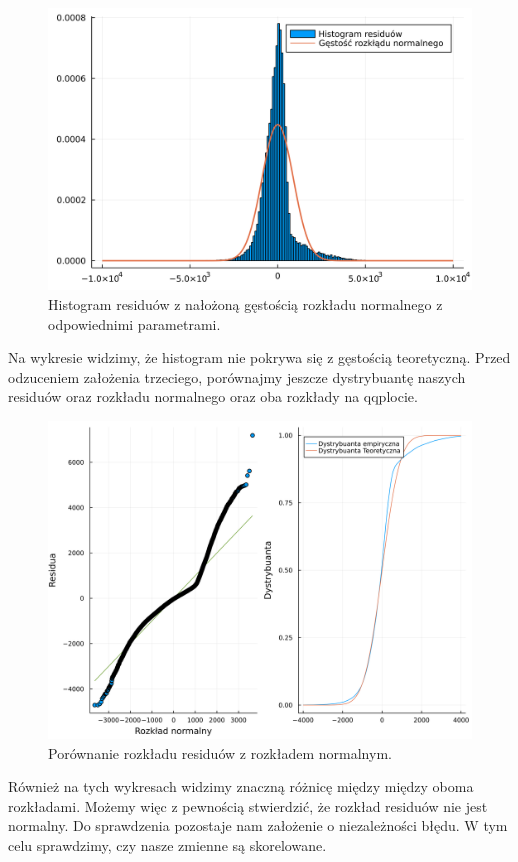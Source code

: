 \documentclass[12pt,leqno]{article}
\theoremstyle{exer}
\begin{document}
	\begin{figure}[H]
		\centering
		\includegraphics[width=4\columnwidth/5]{images/Budnik/res_hist.png}
		\caption{Histogram residuów z nałożoną gęstością rozkładu normalnego z odpowiednimi parametrami.}
	\end{figure}
	Na wykresie widzimy, że histogram nie pokrywa się z gęstością teoretyczną. Przed odzuceniem założenia trzeciego, porównajmy jeszcze dystrybuantę naszych residuów oraz rozkładu normalnego oraz oba rozkłady na qqplocie.
	\begin{figure}[H]
		\centering
		\includegraphics[width=4\columnwidth/5]{images/Budnik/not_zal_3.png}
		\caption{Porównanie rozkładu residuów z rozkładem normalnym.}
	\end{figure}
	Również na tych wykresach widzimy znaczną różnicę między między oboma rozkładami. Możemy więc z pewnością stwierdzić, że rozkład residuów nie jest normalny. Do sprawdzenia pozostaje nam założenie o niezależności błędu. W tym celu sprawdzimy, czy nasze zmienne są skorelowane.
\end{document}

